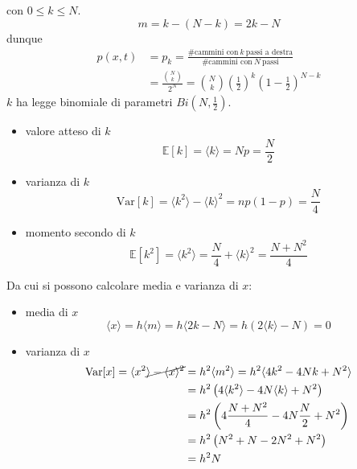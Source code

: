 \documentclass[10pt,a4paper,twoside,openright]{book}
\begin{document}
con $\displaystyle 0\leqslant k\leqslant N$.
\begin{equation*}
m=k-(N-k) =2k-N
\end{equation*}
dunque
\begin{align*}
p(x,t) & =p_{k} =\frac{\text{\#cammini con} \ k\ \text{passi a destra}}{\text{\#cammini con} \ N\ \text{passi}}\\
 & =\frac{\binom{N}{k}}{2^{N}} =\binom{N}{k}\left(\frac{1}{2}\right)^{k}\left( 1-\frac{1}{2}\right)^{N-k}
\end{align*}
$\displaystyle k$ ha legge binomiale di parametri $\displaystyle Bi\left( N,\frac{1}{2}\right)$.
\begin{itemize}
\item valore atteso di $\displaystyle k$\begin{equation*}
\mathbb{E}[k]=\langle k\rangle =Np=\frac{N}{2}
\end{equation*}
\item varianza di $\displaystyle k$\begin{equation*}
\mathrm{Var}[k]=\langle k^{2} \rangle -\langle k\rangle ^{2} =np(1-p)=\frac{N}{4}
\end{equation*}
\item momento secondo di $\displaystyle k$\begin{equation*}
\mathbb{E}[k^2]=\langle k^{2} \rangle =\frac{N}{4} +\langle k\rangle ^{2} =\frac{N+N^2}{4}
\end{equation*}
\end{itemize}

Da cui si possono calcolare media e varianza di $\displaystyle x$:
\begin{itemize}
\item media di $\displaystyle x$\begin{equation*}
\langle x\rangle =h\langle m\rangle =h\langle 2k-N\rangle =h( 2\langle k\rangle -N) =0
\end{equation*}
\item varianza di $\displaystyle x$\begin{align*}
\mathrm{Var}[x]=\langle x^{2} \cancel{\rangle -\langle x \rangle^2}  & =h^{2} \langle m^{2} \rangle =h^{2} \langle 4k^{2} -4Nk+N^{2} \rangle \\
 & =h^{2}\left( 4\langle k^{2} \rangle -4N\langle k\rangle +N^{2}\right)\\
 & =h^{2}\left( 4 \frac{N+N^2}{4} -4 N \frac{N}{2} + N^2 \right)\\
 & =h^{2}\left( N^{2} +N-2N^{2} +N^{2}\right)\\
 & =h^{2} N
\end{align*}
\end{itemize}
\end{document}
